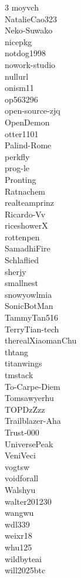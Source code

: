 \documentclass{article}
\begin{document}
\begin{multicols}{3}
moyvch\\
NatalieCao323\\
Neko-Suwako\\
nicepkg\\
notdog1998\\
nowork-studio\\
nullurl\\
onism11\\
op563296\\
open-source-zjq\\
OpenDemon\\
otter1101\\
Palind-Rome\\
perkfly\\
prog-le\\
Pronting\\
Ratnachem\\
realteamprinz\\
Ricardo-Vv\\
riceshowerX\\
rottenpen\\
SamadhiFire\\
Schlaflied\\
sherjy\\
smallnest\\
snowyowlmia\\
SonicBotMan\\
TammyTan516\\
TerryTian-tech\\
therealXiaomanChu\\
thtang\\
titanwings\\
tmstack\\
To-Carpe-Diem\\
Tomsawyerhu\\
TOPDzZzz\\
Trailblazer-Aha\\
Trust-000\\
UniversePeak\\
VeniVeci\\
vogtsw\\
voidforall\\
Walshyu\\
walter201230\\
wangwu\\
wdl339\\
weixr18\\
whu125\\
wildbyteai\\
will2025btc\\

\end{multicols}
\end{document}
